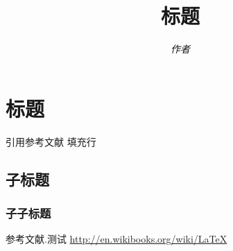 \documentclass[a4paper,11pt]{article}
\title{\bf 标题}
\author{\it 作者}
\date{}
\begin{document}
\maketitle
\section{标题}
引用参考文献\cite{bib:test} \hfill 填充行
\subsection{子标题}
\subsubsection{子子标题}

\renewcommand\refname{参考文献}

\begin{thebibliography}{99}
     参考文献.测试
     \url{http://en.wikibooks.org/wiki/LaTeX}
\end{thebibliography}
\end{document}
